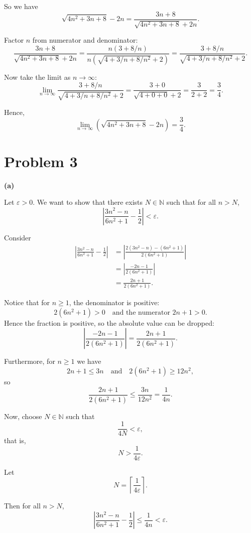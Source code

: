 \documentclass[12pt]{article}
\begin{document}
So we have
\[
	\sqrt{4n^2 + 3n + 8} - 2n = \frac{3n + 8}{\sqrt{4n^2 + 3n + 8} + 2n}.
\]

Factor \(n\) from numerator and denominator:
\[
	\frac{3n + 8}{\sqrt{4n^2 + 3n + 8} + 2n}
	= \frac{n(3 + 8/n)}{n \left( \sqrt{4 + 3/n + 8/n^2} + 2 \right)}
	= \frac{3 + 8/n}{\sqrt{4 + 3/n + 8/n^2} + 2}.
\]

Now take the limit as \(n \to \infty\):
\[
	\lim_{n \to \infty} \frac{3 + 8/n}{\sqrt{4 + 3/n + 8/n^2} + 2}
	= \frac{3 + 0}{\sqrt{4 + 0 + 0} + 2}
	= \frac{3}{2 + 2}
	= \frac{3}{4}.
\]

Hence,
\[
	\lim_{n \to \infty} \left( \sqrt{4n^2 + 3n + 8} - 2n \right) = \frac{3}{4}.
\]

\section*{Problem 3}

\textbf{(a)}

Let $\varepsilon > 0$. We want to show that there exists $N \in \mathbb{N}$ such that for all $n > N$,
\[
	\left| \frac{3n^2 - n}{6n^2 + 1} - \frac{1}{2} \right| < \varepsilon.
\]

Consider
\begin{align*}
	\left| \frac{3n^2 - n}{6n^2 + 1} - \frac{1}{2} \right|
	 & = \left| \frac{2(3n^2 - n) - (6n^2 + 1)}{2(6n^2 + 1)} \right| \\
	 & = \left| \frac{-2n - 1}{2(6n^2 + 1)} \right|                  \\
	 & = \frac{2n + 1}{2(6n^2 + 1)}.
\end{align*}

Notice that for $n \ge 1$, the denominator is positive:
\[
	2(6n^2 + 1) > 0 \quad \text{and the numerator } 2n + 1 > 0.
\]
Hence the fraction is positive, so the absolute value can be dropped:
\[
	\left| \frac{-2n - 1}{2(6n^2 + 1)} \right| = \frac{2n + 1}{2(6n^2 + 1)}.
\]

Furthermore, for $n \ge 1$ we have
\[
	2n + 1 \le 3n \quad \text{and} \quad 2(6n^2 + 1) \ge 12n^2,
\]
so
\[
	\frac{2n + 1}{2(6n^2 + 1)} \le \frac{3n}{12n^2} = \frac{1}{4n}.
\]

Now, choose $N \in \mathbb{N}$ such that
\[
	\frac{1}{4N} < \varepsilon,
\]
that is,
\[
	N > \frac{1}{4\varepsilon}.
\]

Let
\[
	N = \left\lceil \frac{1}{4\varepsilon} \right\rceil.
\]

Then for all $n > N$,
\[
	\left| \frac{3n^2 - n}{6n^2 + 1} - \frac{1}{2} \right| \le \frac{1}{4n} < \varepsilon.
\]
\end{document}
